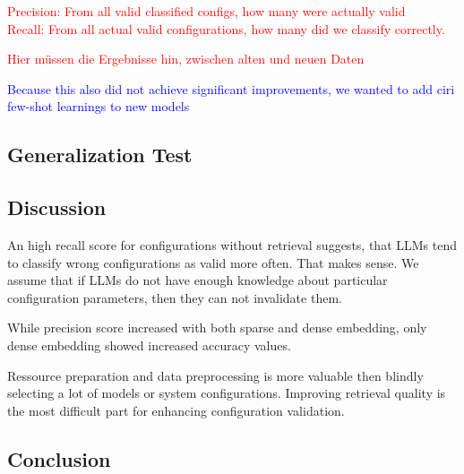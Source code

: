 \textcolor{red}{Precision: From all valid classified configs, how many were actually valid\\Recall: From all actual valid configurations, how many did we classify correctly.}

\textcolor{red}{Hier müssen die Ergebnisse hin, zwischen alten und neuen Daten}

\textcolor{blue}{Because this also did not achieve significant improvements, we wanted to add ciri few-shot learnings to new models}



\subsection{Generalization Test} \label{sec:exp_generalization}

\subsection{Discussion} \label{sec:exp_discussion}

An high recall score for configurations without retrieval suggests, that LLMs tend to classify wrong configurations as valid more often. That makes sense. We assume that if LLMs do not have enough knowledge about particular configuration parameters, then they can not invalidate them. 

While precision score increased with both sparse and dense embedding, only dense embedding showed increased accuracy values.

Ressource preparation and data preprocessing is more valuable then blindly selecting a lot of models or system configurations. Improving retrieval quality is the most difficult part for enhancing configuration validation. 

\subsection{Conclusion} \label{sec:exp_conclusion}

